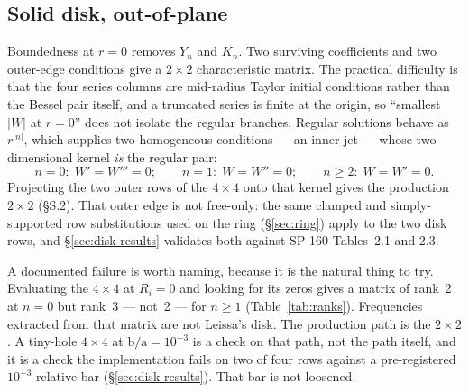 \documentclass[11pt]{article}
\newcommand{\ba}{\mbox{b/a}}
\begin{document}
\subsection{Solid disk, out-of-plane}\label{sec:disk}
Boundedness at $r=0$ removes $Y_n$ and $K_n$. Two surviving coefficients and
two outer-edge conditions give a $2\times2$ characteristic matrix. The
practical difficulty is that the four series columns are mid-radius Taylor
initial conditions rather than the Bessel pair itself, and a truncated series
is finite at the origin, so ``smallest $|W|$ at $r=0$'' does not isolate the
regular branches. Regular solutions behave as $r^{|n|}$, which supplies two
homogeneous conditions --- an inner jet --- whose two-dimensional kernel
\emph{is} the regular pair:
\begin{equation}
n=0:\; W'=W'''=0;\qquad
n=1:\; W=W''=0;\qquad
n\ge2:\; W=W'=0.
\label{eq:jet}
\end{equation}
Projecting the two outer rows of the $4\times4$ onto that kernel gives the
production $2\times2$ (\S{}S.2). That outer edge is not free-only: the same
clamped and simply-supported row substitutions used on the ring
(\S\ref{sec:ring}) apply to the two disk rows, and \S\ref{sec:disk-results}
validates both against SP-160 Tables~2.1 and 2.3.

A documented failure is worth naming, because it is the natural thing to try.
Evaluating the \emph{$4\times4$} at $R_i=0$ and looking for its zeros gives a
matrix of rank~2 at $n=0$ but rank~3 --- not~2 --- for $n\ge1$
(Table~\ref{tab:ranks}). Frequencies extracted from that matrix are not
Leissa's disk. The production path is the $2\times2$. A tiny-hole $4\times4$
at $\ba=10^{-3}$ is a check on that path, not the path itself, and it is a
check the implementation fails on two of four rows against a pre-registered
$10^{-3}$ relative bar (\S\ref{sec:disk-results}). That bar is not loosened.
\end{document}
